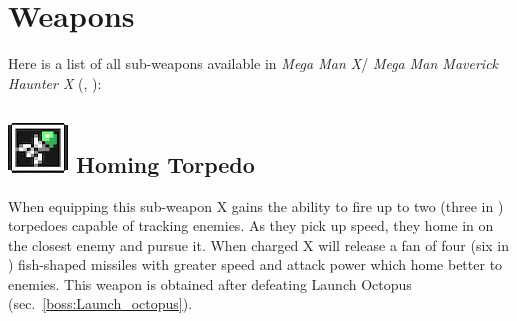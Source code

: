 \chapter{Weapons}\label{X1:sub_weapon}
Here is a list of all sub-weapons available in\textit{ Mega Man X}/ \textit{Mega Man Maverick Haunter X} (\cite{MHX:manual}, \cite{wiki:X_weapons}):

\section{\includegraphics[scale=0.2]{figures/X1/weapons/Homig_T.jpg} Homing Torpedo}\label{Homing_torpedo}
When equipping this sub-weapon X gains the ability to fire up to two (three in \mhx)~\cite{wiki:Homing_torpedo} torpedoes capable of tracking enemies. As they pick up speed, they home in on the closest enemy and pursue it. When charged X will release a fan of four (six in \mhx) fish-shaped missiles with greater speed and attack power which home better to enemies. This weapon is obtained after defeating Launch Octopus (sec.~\ref{boss:Launch_octopus}).
